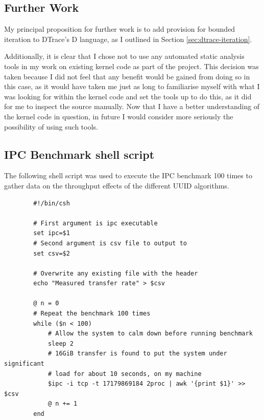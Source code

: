 \documentclass[a4paper,12pt,twoside,openright]{report}
\begin{document}
	\section{Further Work}
	
	My principal proposition for further work is to add provision for bounded iteration to DTrace's D language, as I outlined in Section \ref{sec:dtrace-iteration}.
	
	Additionally, it is clear that I chose not to use any automated static analysis tools in my work on existing kernel code as part of the project. This decision was taken because I did not feel that any benefit would be gained from doing so in this case, as it would have taken me just as long to familiarise myself with what I was looking for within the kernel code and set the tools up to do this, as it did for me to inspect the source manually. Now that I have a better understanding of the kernel code in question, in future I would consider more seriously the possibility of using such tools.
	
	
	
	
	\begin{appendices}
		\chapter{IPC Benchmark shell script}
		\label{appendix:IPC}
		
		The following shell script was used to execute the IPC benchmark 100 times to gather data on the throughput effects of the different UUID algorithms.
		
		\begin{verbatim}
		#!/bin/csh
		
		# First argument is ipc executable
		set ipc=$1
		# Second argument is csv file to output to
		set csv=$2
		
		# Overwrite any existing file with the header
		echo "Measured transfer rate" > $csv
		
		@ n = 0
		# Repeat the benchmark 100 times
		while ($n < 100)
		    # Allow the system to calm down before running benchmark
		    sleep 2
		    # 16GiB transfer is found to put the system under significant
		    # load for about 10 seconds, on my machine
		    $ipc -i tcp -t 17179869184 2proc | awk '{print $1}' >> $csv
		    @ n += 1
		end
		\end{verbatim}
	\end{appendices}
	
	
	
	
	
	
\end{document}
